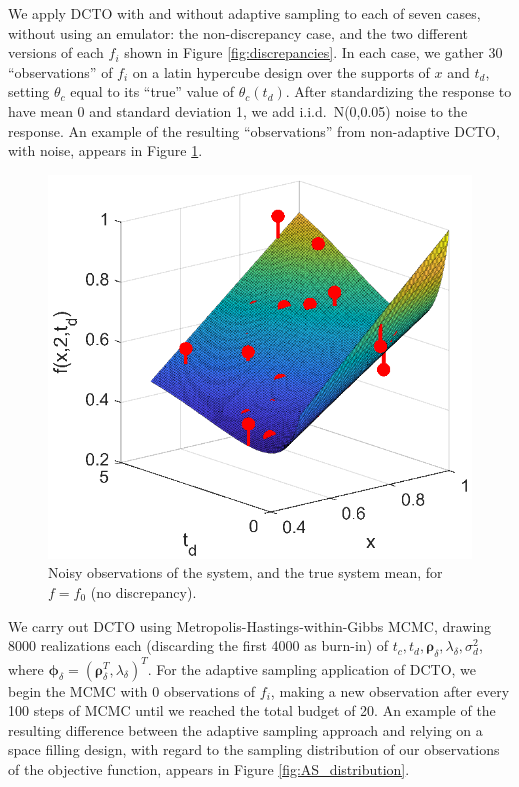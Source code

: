 \documentclass[twocolumn,10pt]{asme2ej}
\begin{document}
%
We apply DCTO with and without adaptive sampling to each of seven cases, without using an emulator: the non-discrepancy case, and the two different versions of each $f_i$ shown in Figure \ref{fig:discrepancies}.
%
In each case, we gather 30 ``observations'' of $f_i$ on a latin hypercube design over the supports of $x$ and $t_d$, setting $\theta_c$ equal to its ``true'' value of $\theta_c(t_d)$.
%
After standardizing the response to have mean 0 and standard deviation 1, we add i.i.d.\ N(0,0.05) noise to the response.
%
An example of the resulting ``observations'' from non-adaptive DCTO, with noise, appears in Figure \ref{fig:observed_data}.
%
\begin{figure}
	\centering
	\includegraphics[scale=0.85]{FIG_observed_data}
	\captionsetup{width=.85\linewidth}
	\caption{Noisy observations of the system, and the true system mean, for $f=f_0$ (no discrepancy).}
	\label{fig:observed_data}
\end{figure}
%
We carry out DCTO using Metropolis-Hastings-within-Gibbs MCMC, drawing 8000 realizations each (discarding the first 4000 as burn-in) of $t_c,t_d,\boldsymbol\rho_{\delta},\lambda_{\delta},\sigma^2_d$, where $\boldsymbol\phi_\delta = (\boldsymbol\rho_\delta^T,\lambda_\delta)^T$.
%
For the adaptive sampling application of DCTO, we begin the MCMC with 0 observations of $f_i$, making a new observation after every 100 steps of MCMC until we reached the total budget of 20.
%
An example of the resulting difference between the adaptive sampling approach and relying on a space filling design, with regard to the sampling distribution of our observations of the objective function, appears in Figure \ref{fig:AS_distribution}.
\end{document}
